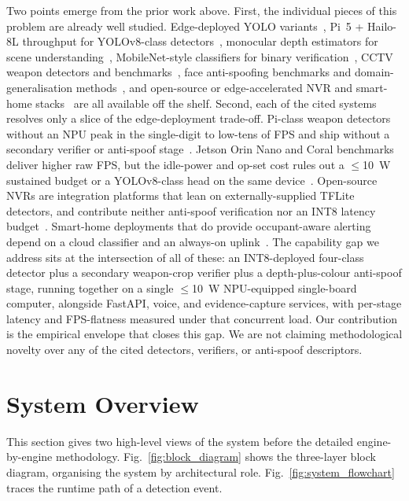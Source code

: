 \documentclass{ieeeaccess}
\begin{document}
Two points emerge from the prior work above. First, the individual pieces of this problem are already well studied. Edge-deployed YOLO variants~\cite{b1,b5,b6}, Pi~5 + Hailo-8L throughput for YOLOv8-class detectors~\cite{b3,b4,b25,b26,b29}, monocular depth estimators for scene understanding~\cite{b14}, MobileNet-style classifiers for binary verification~\cite{b15}, CCTV weapon detectors and benchmarks~\cite{b18,b19,b20,b28,b30,b32}, face anti-spoofing benchmarks and domain-generalisation methods~\cite{b21,b22,b23}, and open-source or edge-accelerated NVR and smart-home stacks~\cite{b24,b27,b31} are all available off the shelf. Second, each of the cited systems resolves only a slice of the edge-deployment trade-off. Pi-class weapon detectors without an NPU peak in the single-digit to low-tens of FPS and ship without a secondary verifier or anti-spoof stage~\cite{b28}. Jetson Orin Nano and Coral benchmarks deliver higher raw FPS, but the idle-power and op-set cost rules out a $\leq$10~W sustained budget or a YOLOv8-class head on the same device~\cite{b25,b26}. Open-source NVRs are integration platforms that lean on externally-supplied TFLite detectors, and contribute neither anti-spoof verification nor an INT8 latency budget~\cite{b24}. Smart-home deployments that do provide occupant-aware alerting depend on a cloud classifier and an always-on uplink~\cite{b31}. The capability gap we address sits at the intersection of all of these: an INT8-deployed four-class detector plus a secondary weapon-crop verifier plus a depth-plus-colour anti-spoof stage, running together on a single $\leq$10~W NPU-equipped single-board computer, alongside FastAPI, voice, and evidence-capture services, with per-stage latency and FPS-flatness measured under that concurrent load. Our contribution is the empirical envelope that closes this gap. We are not claiming methodological novelty over any of the cited detectors, verifiers, or anti-spoof descriptors.

\section{System Overview}
\label{sec:overview}
This section gives two high-level views of the system before the detailed engine-by-engine methodology. Fig.~\ref{fig:block_diagram} shows the three-layer block diagram, organising the system by architectural role. Fig.~\ref{fig:system_flowchart} traces the runtime path of a detection event.
\end{document}
